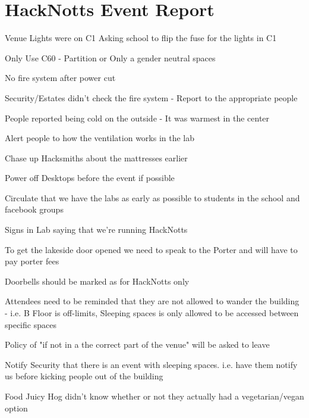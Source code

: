 \documentclass[11pt,hacksoc]{meetingmins}
\begin{document}
\maketitle

\section{HackNotts Event Report}
\begin{items}
\item
Venue
	\subitem
	Lights were on C1
		\subsubitem
		Asking school to flip the fuse for the lights in C1
		
		\subsubitem
		Only Use C60 - Partition or Only a gender neutral spaces
		
	\subitem
	No fire system after power cut
	
		\subsubitem
		Security/Estates didn't check the fire system - Report to the appropriate people
	
	\subitem
	People reported being cold on the outside - It was warmest in the center
	
		\subsubitem
		Alert people to how the ventilation works in the lab
		
	\subitem
	Chase up Hacksmiths about the mattresses earlier
	
	\subitem
	Power off Desktops before the event if possible
	
	\subitem
	Circulate that we have the labs as early as possible to students in the school and facebook groups
	
	\subitem
	Signs in Lab saying that we're running HackNotts
	
	\subitem
	To get the lakeside door opened we need to speak to the Porter and will have to pay porter fees
	
	\subitem
	Doorbells should be marked as for HackNotts only
	
	\subitem
	Attendees need to be reminded that they are not allowed to wander the building - i.e. B Floor is off-limits, Sleeping spaces is only allowed to be accessed between specific spaces
	
	\subitem
	Policy of "if not in a the correct part of the venue" will be asked to leave
	
	\subitem
	Notify Security that there is an event with sleeping spaces. i.e. have them notify us before kicking people out of the building
		
\item
Food
	\subitem
	Juicy Hog didn't know whether or not they actually had a vegetarian/vegan option
		

\end{items}
\end{document}
